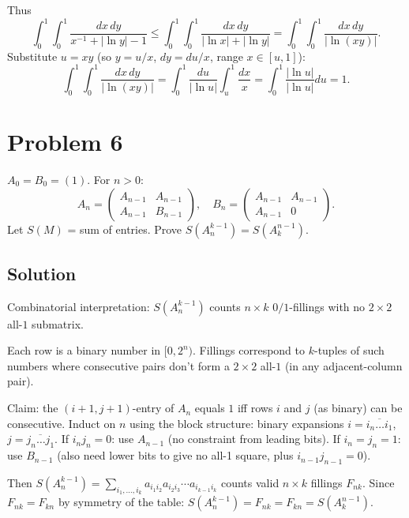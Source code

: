 \documentclass{article}
\begin{document}
Thus
\[
\int_0^1 \int_0^1 \frac{dx\, dy}{x^{-1} + |\ln y| - 1} \le \int_0^1 \int_0^1 \frac{dx\, dy}{|\ln x| + |\ln y|} = \int_0^1 \int_0^1 \frac{dx\, dy}{|\ln(xy)|}.
\]
Substitute $u = xy$ (so $y = u/x$, $dy = du/x$, range $x \in [u, 1]$):
\[
\int_0^1 \int_0^1 \frac{dx\, dy}{|\ln(xy)|} = \int_0^1 \frac{du}{|\ln u|} \int_u^1 \frac{dx}{x} = \int_0^1 \frac{|\ln u|}{|\ln u|} du = 1.
\]

\section*{Problem 6}
$A_0 = B_0 = (1)$. For $n > 0$:
\[
A_n = \begin{pmatrix} A_{n-1} & A_{n-1} \\ A_{n-1} & B_{n-1} \end{pmatrix}, \quad B_n = \begin{pmatrix} A_{n-1} & A_{n-1} \\ A_{n-1} & 0 \end{pmatrix}.
\]
Let $S(M)$ = sum of entries. Prove $S(A_n^{k-1}) = S(A_k^{n-1})$.

\subsection*{Solution}
Combinatorial interpretation: $S(A_n^{k-1})$ counts $n \times k$ $0/1$-fillings with no $2 \times 2$ all-$1$ submatrix.

Each row is a binary number in $[0, 2^n)$. Fillings correspond to $k$-tuples of such numbers where consecutive pairs don't form a $2 \times 2$ all-$1$ (in any adjacent-column pair).

Claim: the $(i+1, j+1)$-entry of $A_n$ equals $1$ iff rows $i$ and $j$ (as binary) can be consecutive. Induct on $n$ using the block structure: binary expansions $i = \overline{i_n \ldots i_1}$, $j = \overline{j_n \ldots j_1}$. If $i_n j_n = 0$: use $A_{n-1}$ (no constraint from leading bits). If $i_n = j_n = 1$: use $B_{n-1}$ (also need lower bits to give no all-1 square, plus $i_{n-1} j_{n-1} = 0$).

Then $S(A_n^{k-1}) = \sum_{i_1, \ldots, i_k} a_{i_1 i_2} a_{i_2 i_3} \cdots a_{i_{k-1} i_k}$ counts valid $n \times k$ fillings $F_{nk}$. Since $F_{nk} = F_{kn}$ by symmetry of the table: $S(A_n^{k-1}) = F_{nk} = F_{kn} = S(A_k^{n-1})$.
\end{document}
